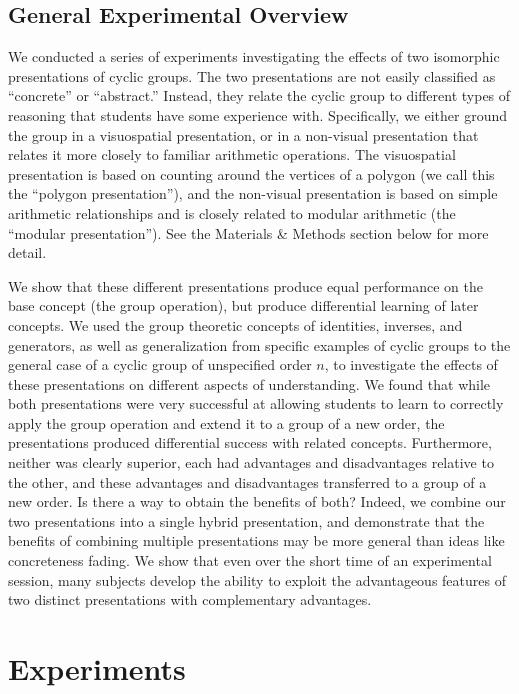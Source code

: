\documentclass[man,10pt]{apa6}
\begin{document}
\subsection{General Experimental Overview}
We conducted a series of experiments investigating the effects of two isomorphic presentations of cyclic groups. The two presentations are not easily classified as ``concrete'' or ``abstract.'' Instead, they relate the cyclic group to different types of reasoning that students have some experience with. Specifically, we either ground the group in a visuospatial presentation, or in a non-visual presentation that relates it more closely to familiar arithmetic operations. The visuospatial presentation is based on counting around the vertices of a polygon (we call this the ``polygon presentation''), and the non-visual presentation is based on simple arithmetic relationships and is closely related to modular arithmetic (the ``modular presentation''). See the Materials \& Methods section below for more detail. \par
We show that these different presentations produce equal performance on the base concept (the group operation), but produce differential learning of later concepts. We used the group theoretic concepts of identities, inverses, and generators, as well as generalization from specific examples of cyclic groups to the general case of a cyclic group of unspecified order $n$, to investigate the effects of these presentations on different aspects of understanding. We found that while both presentations were very successful at allowing students to learn to correctly apply the group operation and extend it to a group of a new order, the presentations produced differential success with related concepts. Furthermore, neither was clearly superior, each had advantages and disadvantages relative to the other, and these advantages and disadvantages transferred to a group of a new order. Is there a way to obtain the benefits of both? Indeed, we combine our two presentations into a single hybrid presentation, and demonstrate that the benefits of combining multiple presentations may be more general than ideas like concreteness fading. We show that even over the short time of an experimental session, many subjects develop the ability to exploit the advantageous features of two distinct presentations with complementary advantages. 
\section{Experiments}
\end{document}

